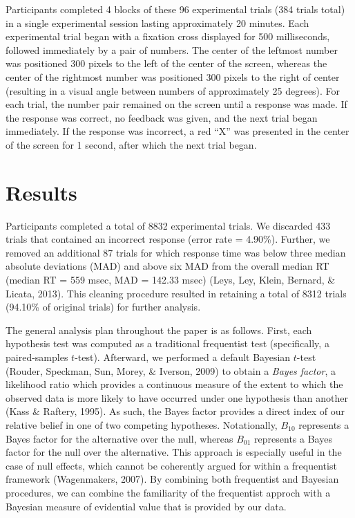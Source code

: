 \documentclass[english,man]{apa6}
\theoremstyle{definition}
\theoremstyle{definition}
\theoremstyle{definition}
\theoremstyle{remark}
\begin{document}
Participants completed 4 blocks of these 96 experimental trials (384
trials total) in a single experimental session lasting approximately 20
minutes. Each experimental trial began with a fixation cross displayed
for 500 milliseconds, followed immediately by a pair of numbers. The
center of the leftmost number was positioned 300 pixels to the left of
the center of the screen, whereas the center of the rightmost number was
positioned 300 pixels to the right of center (resulting in a visual
angle between numbers of approximately 25 degrees). For each trial, the
number pair remained on the screen until a response was made. If the
response was correct, no feedback was given, and the next trial began
immediately. If the response was incorrect, a red \enquote{X} was
presented in the center of the screen for 1 second, after which the next
trial began.

\section{Results}\label{results}

Participants completed a total of 8832 experimental trials. We discarded
433 trials that contained an incorrect response (error rate = 4.90\%).
Further, we removed an additional 87 trials for which response time was
below three median absolute deviations (MAD) and above six MAD from the
overall median RT (median RT = 559 msec, MAD = 142.33 msec) (Leys, Ley,
Klein, Bernard, \& Licata, 2013). This cleaning procedure resulted in
retaining a total of 8312 trials (94.10\% of original trials) for
further analysis.

The general analysis plan throughout the paper is as follows. First,
each hypothesis test was computed as a traditional frequentist test
(specifically, a paired-samples \(t\)-test). Afterward, we performed a
default Bayesian \(t\)-test (Rouder, Speckman, Sun, Morey, \& Iverson,
2009) to obtain a \emph{Bayes factor}, a likelihood ratio which provides
a continuous measure of the extent to which the observed data is more
likely to have occurred under one hypothesis than another (Kass \&
Raftery, 1995). As such, the Bayes factor provides a direct index of our
relative belief in one of two competing hypotheses. Notationally,
\(B_{10}\) represents a Bayes factor for the alternative over the null,
whereas \(B_{01}\) represents a Bayes factor for the null over the
alternative. This approach is especially useful in the case of null
effects, which cannot be coherently argued for within a frequentist
framework (Wagenmakers, 2007). By combining both frequentist and
Bayesian procedures, we can combine the familiarity of the frequentist
approch with a Bayesian measure of evidential value that is provided by
our data.
\end{document}
